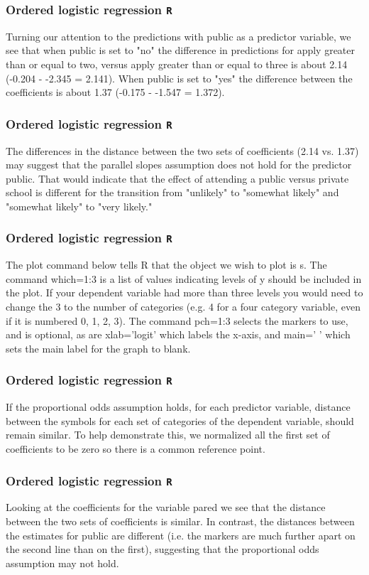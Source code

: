 \documentclass[00-GLMregslides.tex]{subfiles}
\begin{document}
	\begin{frame}[fragile]
		\frametitle{Ordered logistic regression \texttt{R} }
		\Large
		Turning our attention to the predictions with public as a predictor variable, we see that when public is set to "no" the difference in predictions for apply greater than or equal to two, versus apply greater than or equal to three is about 2.14 (-0.204 - -2.345 = 2.141). When public is set to "yes" the difference between the coefficients is about 1.37 (-0.175 - -1.547 = 1.372).
	\end{frame}
	
	\begin{frame}[fragile]
		\frametitle{Ordered logistic regression \texttt{R} }
		\Large
		The differences in the distance between the two sets of coefficients (2.14 vs. 1.37) may suggest that the parallel slopes assumption does not hold for the predictor public. That would indicate that the effect of attending a public versus private school is different for the transition from "unlikely" to "somewhat likely" and "somewhat likely" to "very likely."
	\end{frame}
	\begin{frame}[fragile]
		\frametitle{Ordered logistic regression \texttt{R} }
		\Large
		The plot command below tells R that the object we wish to plot is s. The command which=1:3 is a list of values indicating levels of y should be included in the plot. If your dependent variable had more than three levels you would need to change the 3 to the number of categories (e.g. 4 for a four category variable, even if it is numbered 0, 1, 2, 3). The command pch=1:3 selects the markers to use, and is optional, as are xlab='logit' which labels the x-axis, and main=' ' which sets the main label for the graph to blank. 
	\end{frame}
	
	\begin{frame}[fragile]
		\frametitle{Ordered logistic regression \texttt{R} }
		\Large
		If the proportional odds assumption holds, for each predictor variable, distance between the symbols for each set of categories of the dependent variable, should remain similar. To help demonstrate this, we normalized all the first set of coefficients to be zero so there is a common reference point.
		
	\end{frame}
	
	\begin{frame}[fragile]
		\frametitle{Ordered logistic regression \texttt{R} }
		\Large
		Looking at the coefficients for the variable pared we see that the distance between the two sets of coefficients is similar. In contrast, the distances between the estimates for public are different (i.e. the markers are much further apart on the second line than on the first), suggesting that the proportional odds assumption may not hold.
	\end{frame}
\end{document}
